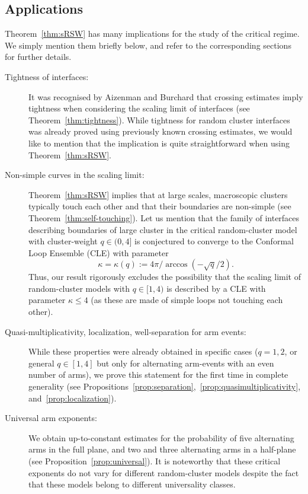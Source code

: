 \documentclass[a4paper,oneside,11pt]{article}
\numberwithin{equation}{section}
\numberwithin{equation}{section}
\numberwithin{equation}{section}
\begin{document}
\subsection{Applications}

Theorem~\ref{thm:sRSW} has many implications for the study of the critical regime. We simply mention them briefly below, and refer to the corresponding sections for further details.
\begin{description}
\item[Tightness of interfaces:] It was recognised by Aizenman and Burchard \cite{AizBur99} that crossing estimates imply tightness when considering the scaling limit of interfaces (see Theorem~\ref{thm:tightness}). 
While tightness for random cluster interfaces was already proved \cite{KemSmi16,CheDumHon12a} using previously known crossing estimates, we would like to mention that the implication is quite straightforward when using Theorem~\ref{thm:sRSW}. 
\item[Non-simple curves in the scaling limit:] Theorem~\ref{thm:sRSW} implies that at large scales, macroscopic clusters typically touch each other and that their boundaries are non-simple (see Theorem~\ref{thm:self-touching}).
Let us mention that the family of interfaces describing boundaries of large cluster in the critical random-cluster model with cluster-weight $q\in(0,4]$ is conjectured  \cite{RohSch05} to converge to the Conformal Loop Ensemble (CLE) \cite{SW} with parameter 
$$\kappa=\kappa(q):=4\pi/\arccos(-\sqrt q/2).$$
Thus, our result rigorously excludes the possibility that the scaling limit of random-cluster models with $q \in [1,4)$ is described by a CLE with parameter $\kappa\le 4$ (as these are made of simple loops not touching each other).
\item[Quasi-multiplicativity, localization, well-separation for arm events:] While these properties were already obtained in specific cases ($q=1,2$, or general $q \in [1,4]$ but only for alternating arm-events with an even number of arms), we prove this statement for the first time in complete generality (see Propositions~\ref{prop:separation},~\ref{prop:quasimultiplicativity}, and~\ref{prop:localization}). 
\item[Universal arm exponents:] We obtain up-to-constant estimates for the probability of five alternating arms in the full plane, and two and three alternating arms in a half-plane (see Proposition~\ref{prop:universal}). 
It is noteworthy that these critical exponents do not vary for different random-cluster models despite the fact that these models belong to different universality classes.

\end{description}
\end{document}
